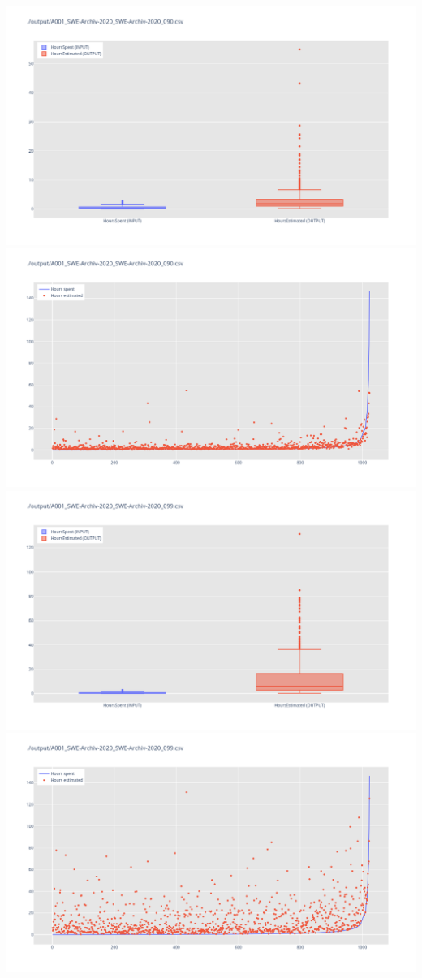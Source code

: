 \includegraphics[width=\textwidth]{Scripts/output/A001_SWE-Archiv-2020_SWE-Archiv-2020_090.csv.png}
\includegraphics[width=\textwidth]{Scripts/output/A001_SWE-Archiv-2020_SWE-Archiv-2020_090.csv.scatter.png}
\includegraphics[width=\textwidth]{Scripts/output/A001_SWE-Archiv-2020_SWE-Archiv-2020_099.csv.png}
\includegraphics[width=\textwidth]{Scripts/output/A001_SWE-Archiv-2020_SWE-Archiv-2020_099.csv.scatter.png}
